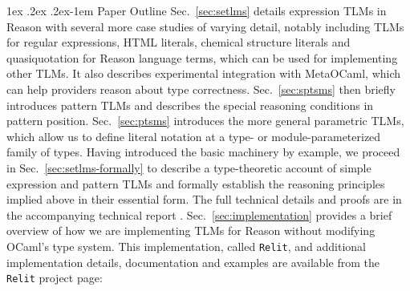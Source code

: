 \documentclass[acmsmall]{acmart}
\makeatletter
\renewcommand{\paragraph}{%
  \@startsection{paragraph}{4}%
  {\z@}{1ex \@plus .2ex \@minus .2ex}{-1em}%
  {\normalfont\normalsize\bfseries}%
}
\newcommand{\li}[1]{\lstinline[basicstyle=\ttfamily\fontsize{9pt}{1em}\selectfont]{#1}}
\makeatother
\begin{document}
\paragraph{Paper Outline} 
Sec.~\ref{sec:setlms} details expression TLMs in Reason with several more case studies of varying detail, notably including TLMs for regular expressions, HTML literals, chemical structure literals and quasiquotation for Reason language terms, which can be used for implementing other TLMs. It also describes experimental integration with MetaOCaml, which can help providers reason about type correctness.
Sec.~\ref{sec:sptsms} then briefly introduces {pattern TLMs} and describes the special reasoning conditions in pattern position. %
Sec.~\ref{sec:ptsms} introduces the more general {parametric TLMs}, which allow us to define literal notation at a type- or module-parameterized family of types.
 Having introduced the basic machinery by example, we proceed in 
Sec.~\ref{sec:setlms-formally} to describe a type-theoretic account of simple expression and pattern TLMs and formally establish the reasoning principles implied above in their essential form. The full technical details and proofs are in the accompanying technical report \cite{icfp18tr}.
Sec.~\ref{sec:implementation} provides a brief overview of how we are implementing TLMs for Reason without modifying OCaml's type system. %
This implementation, called \li{Relit}, and additional implementation details, documentation and examples are available from the \li{Relit} project page:
\end{document}
